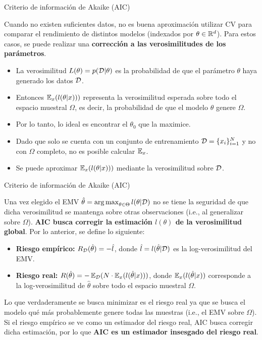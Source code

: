 \documentclass[handout, 9pt]{beamer}
\begin{document}
\begin{frame}{Criterio de información de Akaike (AIC)}

Cuando no existen suficientes datos, no es buena aproximación utilizar CV para comparar el rendimiento de distintos modelos (indexados por $\theta\in\mathbb{R}^d$). Para estos casos, se puede realizar una \textbf{corrección a las verosimilitudes de los parámetros}.

\begin{itemize}
	\item La verosimilitud $L(\theta)=p({\mathcal D}|\theta)$ es la probabilidad de que el parámetro $\theta$ haya generado los datos ${\mathcal D}$.
	\item Entonces $\operatorname{\mathbb{E}}_x(l(\theta|x)))$ representa la verosimilitud esperada sobre todo el espacio muestral $\Omega$, es decir, la probabilidad de que el modelo $\theta$ genere $\Omega$.
	\item Por lo tanto, lo ideal es encontrar el $\theta_0$ que la maximice.
	\item Dado que solo se cuenta con un conjunto de entrenamiento ${\mathcal D}=\{x_i\}_{i=1}^N$ y no con $\Omega$ completo, no es posible calcular $\operatorname{\mathbb{E}}_x$.
	\item Se puede aproximar $\operatorname{\mathbb{E}}_x(l(\theta|x)))$ mediante la verosimilitud sobre ${\mathcal D}$.
\end{itemize}
	
\end{frame}

\begin{frame}{Criterio de información de Akaike (AIC)}

Una vez elegido el EMV $\hat{\theta}=\operatorname*{arg\,max}_{\theta\in\Theta} l(\theta|{\mathcal D})$ no se tiene la seguridad de que dicha verosimilitud se mantenga sobre otras observaciones (i.e., al generalizar sobre $\Omega$). \textbf{AIC busca corregir la estimación $l(\theta)$ de la verosimilitud global}. Por lo anterior, se define lo siguiente:

\begin{itemize}
	\item \textbf{Riesgo empírico:} $R_{\mathcal D}(\hat{\theta})=-\hat{l}$, donde $\hat{l}=l(\hat{\theta}|{\mathcal D})$ es la log-verosimilitud del EMV.
	\item \textbf{Riesgo real:} $R(\hat{\theta})=-\operatorname{\mathbb{E}}_{\mathcal D}(N\cdot \operatorname{\mathbb{E}}_x(l(\hat{\theta}|x)))$, donde $\operatorname{\mathbb{E}}_x(l(\hat{\theta}|x))$ corresponde a la log-verosimilitud de $\hat{\theta}$ sobre todo el espacio muestral $\Omega$.
\end{itemize}
	
Lo que verdaderamente se busca minimizar es el riesgo real ya que se busca el modelo qué más probablemente genere todas las muestras (i.e., el EMV sobre $\Omega$).\\

Si el riesgo empírico se ve como un estimador del riesgo real, AIC busca corregir dicha estimación, por lo que \textbf{AIC es un estimador insesgado del riesgo real}.
	
\end{frame}
\end{document}
